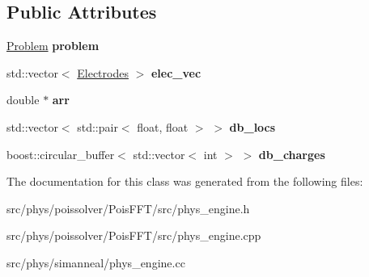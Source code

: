 \subsection*{Public Attributes}
\begin{DoxyCompactItemize}
\item 
\hyperlink{classphys_1_1Problem}{Problem} {\bfseries problem}\hypertarget{classphys_1_1PhysicsEngine_af6e1f75210be204a5ff58d49e74d9357}{}\label{classphys_1_1PhysicsEngine_af6e1f75210be204a5ff58d49e74d9357}

\item 
std\+::vector$<$ \hyperlink{classElectrodes}{Electrodes} $>$ {\bfseries elec\+\_\+vec}\hypertarget{classphys_1_1PhysicsEngine_a482502d72c78f3f767456cd80572d169}{}\label{classphys_1_1PhysicsEngine_a482502d72c78f3f767456cd80572d169}

\item 
double $\ast$ {\bfseries arr}\hypertarget{classphys_1_1PhysicsEngine_aeac524265a1d847a50ef8abb68b1d117}{}\label{classphys_1_1PhysicsEngine_aeac524265a1d847a50ef8abb68b1d117}

\item 
std\+::vector$<$ std\+::pair$<$ float, float $>$ $>$ {\bfseries db\+\_\+locs}\hypertarget{classphys_1_1PhysicsEngine_a2fbad37d4f3f9caf5d1b8762f41dc54f}{}\label{classphys_1_1PhysicsEngine_a2fbad37d4f3f9caf5d1b8762f41dc54f}

\item 
boost\+::circular\+\_\+buffer$<$ std\+::vector$<$ int $>$ $>$ {\bfseries db\+\_\+charges}\hypertarget{classphys_1_1PhysicsEngine_a7f7bc0e9aaaa76871aace9ee145f0c2c}{}\label{classphys_1_1PhysicsEngine_a7f7bc0e9aaaa76871aace9ee145f0c2c}

\end{DoxyCompactItemize}


The documentation for this class was generated from the following files\+:\begin{DoxyCompactItemize}
\item 
src/phys/poissolver/\+Pois\+F\+F\+T/src/phys\+\_\+engine.\+h\item 
src/phys/poissolver/\+Pois\+F\+F\+T/src/phys\+\_\+engine.\+cpp\item 
src/phys/simanneal/phys\+\_\+engine.\+cc\end{DoxyCompactItemize}

